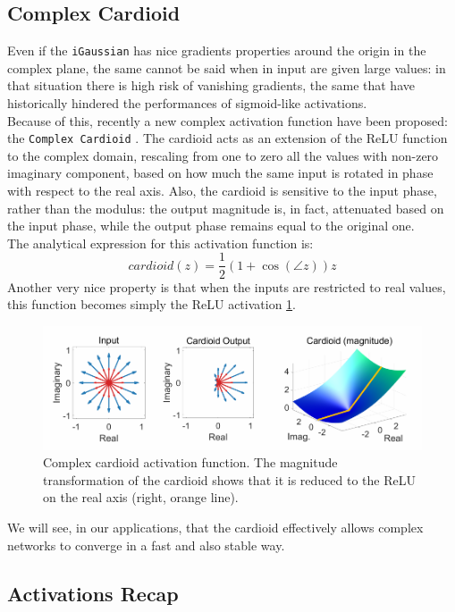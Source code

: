 \documentclass[../main.tex]{subfiles}
\begin{document}
\subsection*{Complex Cardioid}
Even if the \texttt{iGaussian} has nice gradients properties around the origin in the complex plane, the same cannot be said when in input are given large values: in that situation there is high risk of vanishing gradients, the same that have historically hindered the performances of sigmoid-like activations.\\
Because of this, recently a new complex activation function have been proposed: the \texttt{Complex Cardioid} \cite{Virtue:EECS-2019-126}. The cardioid acts as an extension of the ReLU function to the complex domain, rescaling from one to zero all the values with non-zero imaginary component, based on how much the same input is rotated in phase with respect to the real axis. Also, the cardioid is sensitive to the input phase, rather than the modulus: the output magnitude is, in fact, attenuated based on the input phase, while the output phase remains equal to the original one.\\
The analytical expression for this activation function is:
\[ cardioid(z) = \frac{1}{2}\left(1 + \cos(\angle z)\right)z \]
Another very nice property is that when the inputs are restricted to real values, this function becomes simply the ReLU activation \ref{fig:cmplx_cardioid}.
\begin{figure}[!ht]
	\centering
	\includegraphics[width=\textwidth]{pictures/cmplx_cardioid}
	\caption{Complex cardioid activation function. 
	The magnitude transformation of the cardioid shows that it is reduced to
the ReLU on the real axis (right, orange line).}
	\label{fig:cmplx_cardioid}
\end{figure}
We will see, in our applications, that the cardioid effectively allows complex networks to converge in a fast and also stable way.


\subsection*{Activations Recap}
\end{document}
